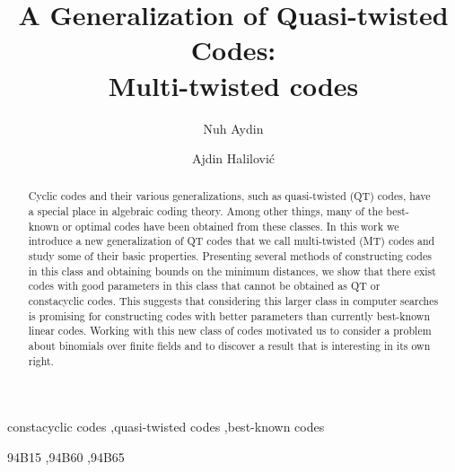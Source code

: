 \documentclass[preprint,12pt]{elsarticle}
\begin{document}
\begin{frontmatter}



\title{A Generalization of Quasi-twisted Codes:\\ Multi-twisted codes}

 \author[label1]{Nuh Aydin}
  \author[label2]{Ajdin Halilovi\'c}
\address[label1]{Kenyon College, Department of Mathematics, Gambier, OH 43022}
 \address[label2]{Lumina-The University of South-East Europe, os. Colentina 64b, 021187 Bucharest, Romania}


\begin{abstract}
Cyclic codes and their various generalizations, such as quasi-twisted (QT) codes, have a special place in algebraic coding theory. Among other things, many of the best-known or optimal codes have been obtained from these classes. In this work we introduce a new generalization of QT codes that we call multi-twisted (MT) codes and study some of their basic properties. Presenting several methods of constructing codes in this class and obtaining bounds on the minimum distances, we show that  there exist codes with good parameters in this class that cannot be obtained as QT or constacyclic codes. This suggests that considering this larger class in computer searches is promising for constructing codes with better parameters than currently best-known linear codes. Working with this new class of codes motivated us to consider a problem about binomials over finite fields and to discover a result that is interesting in its own right. 
\end{abstract}

\begin{keyword}
constacyclic codes \sep quasi-twisted codes \sep best-known codes 

\MSC 94B15 \sep 94B60 \sep 94B65 

\end{keyword}

\end{frontmatter}
\end{document}
